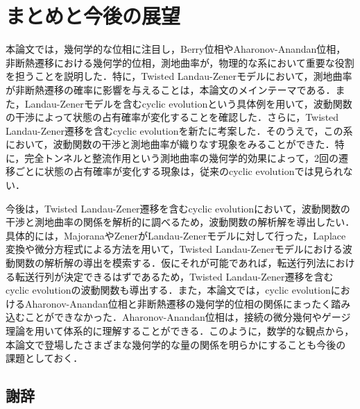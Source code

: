 \chapter{まとめと今後の展望}
本論文では，幾何学的な位相に注目し，Berry位相やAharonov-Anandan位相，非断熱遷移における幾何学的位相，測地曲率が，物理的な系において重要な役割を担うことを説明した．特に，Twisted Landau-Zenerモデルにおいて，測地曲率が非断熱遷移の確率に影響を与えることは，本論文のメインテーマである．また，Landau-Zenerモデルを含むcyclic evolutionという具体例を用いて，波動関数の干渉によって状態の占有確率が変化することを確認した．さらに，Twisted Landau-Zener遷移を含むcyclic evolutionを新たに考案した．そのうえで，この系において，波動関数の干渉と測地曲率が織りなす現象をみることができた．特に，完全トンネルと整流作用という測地曲率の幾何学的効果によって，2回の遷移ごとに状態の占有確率が変化する現象は，従来のcyclic evolutionでは見られない．


今後は，Twisted Landau-Zener遷移を含むcyclic evolutionにおいて，波動関数の干渉と測地曲率の関係を解析的に調べるため，波動関数の解析解を導出したい．具体的には，MajoranaやZenerがLandau-Zenerモデルに対して行った，Laplace変換や微分方程式による方法を用いて，Twisted Landau-Zenerモデルにおける波動関数の解析解の導出を模索する．仮にそれが可能であれば，転送行列法における転送行列が決定できるはずであるため，Twisted Landau-Zener遷移を含むcyclic evolutionの波動関数も導出する．また，本論文では，cyclic evolutionにおけるAharonov-Anandan位相と非断熱遷移の幾何学的位相の関係にまったく踏み込むことができなかった．Aharonov-Anandan位相は，接続の微分幾何やゲージ理論を用いて体系的に理解することができる．このように，数学的な観点から，本論文で登場したさまざまな幾何学的な量の関係を明らかにすることも今後の課題としておく．


\section*{謝辞}
\acknowledgement